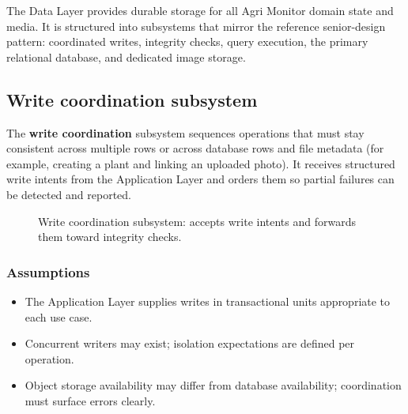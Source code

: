 The Data Layer provides durable storage for all Agri Monitor domain state and media. It is structured into subsystems that mirror the reference senior-design pattern: coordinated writes, integrity checks, query execution, the primary relational database, and dedicated image storage.

\subsection{Write coordination subsystem}

The \textbf{write coordination} subsystem sequences operations that must stay consistent across multiple rows or across database rows and file metadata (for example, creating a plant and linking an uploaded photo). It receives structured write intents from the Application Layer and orders them so partial failures can be detected and reported.

\begin{figure}[H]
\centering
{}
\caption{Write coordination subsystem: accepts write intents and forwards them toward integrity checks.}
\label{fig:data-write}
\end{figure}

\subsubsection{Assumptions}
\begin{itemize}
  \item The Application Layer supplies writes in transactional units appropriate to each use case.
  \item Concurrent writers may exist; isolation expectations are defined per operation.
  \item Object storage availability may differ from database availability; coordination must surface errors clearly.
\end{itemize}


